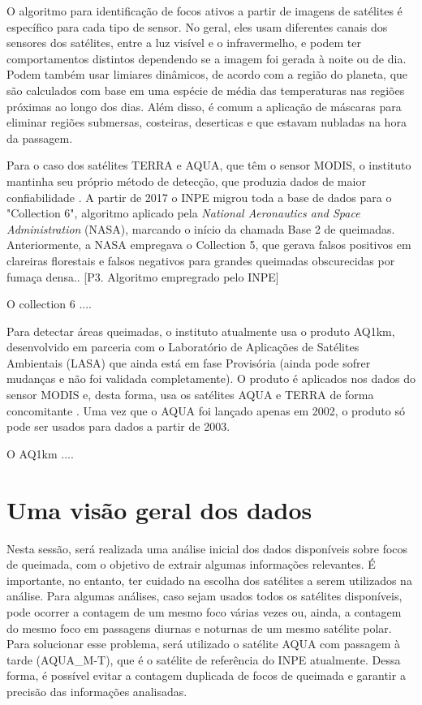 \documentclass[cic,tc]{iiufrgs}
\begin{document}
O algoritmo para identificação de focos ativos a partir de imagens de satélites é específico para cada tipo de sensor. No geral, eles usam diferentes canais dos sensores dos satélites, entre a luz visível e o infravermelho, e podem ter comportamentos distintos dependendo se a imagem foi gerada à noite ou de dia. Podem também usar limiares dinâmicos, de acordo com a região do planeta, que são calculados com base em uma espécie de média das temperaturas nas regiões próximas ao longo dos dias. Além disso, é comum a aplicação de máscaras para eliminar regiões submersas, costeiras, deserticas e que estavam nubladas na hora da passagem. \par

Para o caso dos satélites TERRA e AQUA, que têm o sensor MODIS, o instituto mantinha seu próprio método de detecção, que produzia dados de maior confiabilidade \citep{PerguntasFrequentesINPE}. A partir de 2017 o INPE migrou toda a base de dados para o "Collection 6", algoritmo aplicado pela \textit{National Aeronautics and Space Administration} (NASA), marcando o início da chamada Base 2 de queimadas. Anteriormente, a NASA empregava o Collection 5, que gerava falsos positivos em clareiras florestais e falsos negativos para grandes queimadas obscurecidas por fumaça densa.\citep{SCHROEDER2008}. [P3. Algoritmo empregrado pelo INPE] \par

O collection 6 .... \citep{GIGLIO2016} \par

Para detectar áreas queimadas, o instituto atualmente usa o produto AQ1km, desenvolvido em parceria com o Laboratório de Aplicações de Satélites Ambientais (LASA) \citep{SiteAQ1km} que ainda está em fase Provisória (ainda pode sofrer mudanças e não foi validada completamente). O produto é aplicados nos dados do sensor MODIS e, desta forma, usa os satélites AQUA e TERRA de forma concomitante \citep{libonati2015algorithm}. Uma vez que o AQUA foi lançado apenas em 2002, o produto só pode ser usados para dados a partir de 2003. \par

O AQ1km .... \citep{libonati2015algorithm} \par

\section{Uma visão geral dos dados}

Nesta sessão, será realizada uma análise inicial dos dados disponíveis sobre focos de queimada, com o objetivo de extrair algumas informações relevantes. É importante, no entanto, ter cuidado na escolha dos satélites a serem utilizados na análise. Para algumas análises, caso sejam usados todos os satélites disponíveis, pode ocorrer a contagem de um mesmo foco várias vezes ou, ainda, a contagem do mesmo foco em passagens diurnas e noturnas de um mesmo satélite polar. Para solucionar esse problema, será utilizado o satélite AQUA com passagem à tarde (AQUA\_M-T), que é o satélite de referência do INPE atualmente. Dessa forma, é possível evitar a contagem duplicada de focos de queimada e garantir a precisão das informações analisadas. \par
\end{document}
